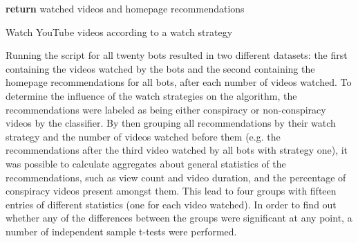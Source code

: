 \documentclass[../main.tex]{subfiles}
\begin{document}
\begin{algorithm}[H]
 
 \vspace{0.075in}

 \vspace{0.05in}
 \textbf{return} watched videos and homepage recommendations\;
 \caption{Watch YouTube videos according to a watch strategy}
\end{algorithm}

\vspace{0.25in}

\linenumbers

\noindent Running the script for all twenty bots resulted in two different datasets: the first containing
the videos watched by the bots and the second containing the homepage recommendations for all bots, after 
each number of videos watched. To determine the influence of the watch strategies on the algorithm, the 
recommendations were labeled as being either conspiracy or non-conspiracy videos by the classifier. By then 
grouping all recommendations by their watch strategy and the number of videos watched before them (e.g. the 
recommendations after the third video watched by all bots with strategy one), it was possible to calculate 
aggregates about general statistics of the recommendations, such as view count and video duration, and the 
percentage of conspiracy videos present amongst them. This lead to four groups with fifteen entries of 
different statistics (one for each video watched). In order to find out whether any of the differences 
between the groups were significant at any point, a number of independent sample t-tests were performed. 
\end{document}
